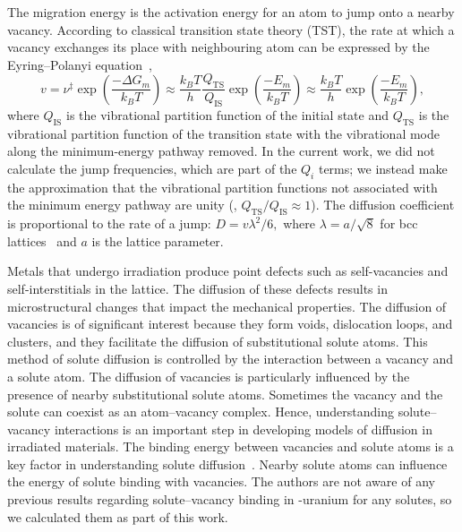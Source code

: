 The migration energy is the activation energy for an atom to jump onto a
nearby vacancy. According to classical transition state theory (TST), the rate
at which a vacancy exchanges its place with neighbouring atom can be expressed
by the Eyring--Polanyi
equation~\cite{Eyring1935,Evans1935,vineyard1957frequency},
\begin{equation}
    v = \nu^\ddagger \exp\left(\frac{-\Delta G_m}{k_B T}\right)
      \approx \frac{k_B T}{h} \frac{Q_\text{TS}}{Q_\text{IS}}
              \exp\left(\frac{-E_m}{k_B T}\right)
      \approx \frac{k_B T}{h}
              \exp\left(\frac{-E_m}{k_B T}\right),
\end{equation}
where $Q_\text{IS}$ is the vibrational partition function of the initial
state and $Q_\text{TS}$ is the vibrational partition function of the transition
state with the vibrational mode along the minimum-energy pathway removed.
In the current work, we did not calculate the jump frequencies, which are
part of the $Q_i$ terms; we instead make the approximation that the vibrational
partition functions not associated with the minimum energy pathway are unity
(\ie, $Q_\text{TS}/Q_\text{IS} \approx 1$).
The diffusion coefficient is proportional to the rate of a jump:
$D = v\lambda^2/6,$ where $\lambda = a/\sqrt{8}$ for bcc
lattices~\cite{Heinola2010a} and $a$ is the lattice parameter.


Metals that undergo irradiation produce point defects such as self-vacancies and self-interstitials in the lattice. The diffusion of these defects results in microstructural changes that impact the mechanical properties. The diffusion of vacancies is of significant interest because they form voids, dislocation loops, and clusters, and they facilitate the diffusion of substitutional solute atoms. This method of solute diffusion is controlled by the interaction between a vacancy and a solute atom. The diffusion of vacancies is particularly influenced by the presence of nearby substitutional solute atoms. Sometimes the vacancy and the solute can coexist as an atom--vacancy complex. Hence, understanding solute--vacancy interactions is an important step in developing models of diffusion in irradiated materials.
The binding energy between vacancies and solute atoms is a key factor in understanding solute 
diffusion~\cite{balluffi1973diffusion, wolverton2007solute}. Nearby solute atoms
can influence the energy of solute binding with vacancies. The authors are not aware of any previous results regarding solute--vacancy
binding in \textgamma-uranium for any solutes, so we calculated them as part of
this work.


